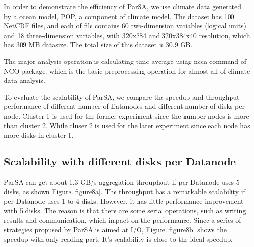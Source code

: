 \documentclass[preprint,12pt]{elsarticle}
\begin{document}
In order to demonstrate the efficiency of ParSA, we use climate data generated by a ocean model, POP, a component of climate model. The 
dataset has 100 NetCDF files, and each of file contains 60 two-dimension variables (logical units) and 18 three-dimension variables, with
320x384 and 320x384x40 resolution, which has 309 MB datasize. The total size of this dataset is 30.9 GB. \par 
The major analysis operation is calculating time average using ncea command of NCO package, which is the basic preprocessing operation
for almost all of climate data analysis. \par
To evaluate the scalability of ParSA, we compare the speedup and throughput performance of different number of Datanodes and different
number of disks per node. Cluster 1 is used for the former experiment since the number nodes is more than cluster 2. While 
cluser 2 is used for the later experiment since each node has more disks in cluster 1. \par 

\subsection{Scalability with different disks per Datanode}
ParSA can get about 1.3 GB/s aggregation throuphout if per Datanode uses 5 disks, as shown Figure.\ref{figure8a}. The throughput has a 
remarkable scalability if per Datanode uses 1 to 4 disks. However, it has little performance improvement with 5 disks. The reason is 
that there are some serial operations, such as writing results and communication, which impact on the performance. Since a series of 
strategies propused by ParSA is aimed at I/O, Figure.\ref{figure8b} shows the speedup with only reading part. It's scalability is close
to the ideal speedup. 
\end{document}
